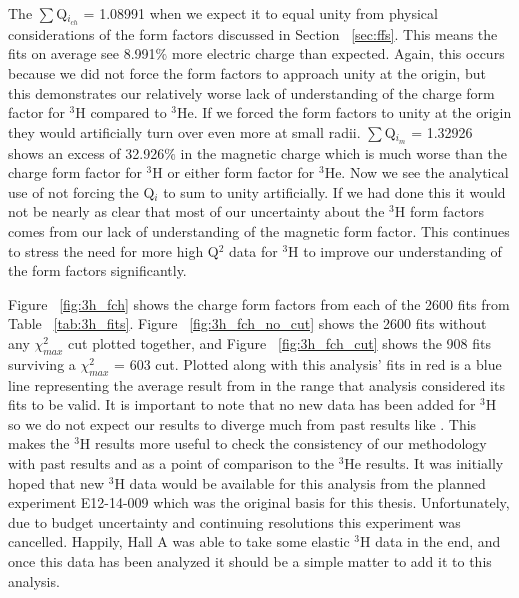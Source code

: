 The $\sum$Q$_{i_{ch}}$ = 1.08991 when we expect it to equal unity from physical considerations of the form factors discussed in Section ~\ref{sec:ffs}. This means the fits on average see 8.991$\%$ more electric charge than expected. Again, this occurs because we did not force the form factors to approach unity at the origin, but this demonstrates our relatively worse lack of understanding of the charge form factor for $^3$H compared to $^3$He. If we forced the form factors to unity at the origin they would artificially turn over even more at small radii. $\sum$Q$_{i_{m}}$ = 1.32926 shows an excess of 32.926$\%$ in the magnetic charge which is much worse than the charge form factor for $^3$H or either form factor for $^3$He. Now we see the analytical use of not forcing the Q$_i$ to sum to unity artificially. If we had done this it would not be nearly as clear that most of our uncertainty about the $^3$H form factors comes from our lack of understanding of the magnetic form factor. This continues to stress the need for more high Q$^2$ data for $^3$H to improve our understanding of the form factors significantly.

Figure ~\ref{fig:3h_fch} shows the charge form factors from each of the 2600 fits from Table ~\ref{tab:3h_fits}. Figure ~\ref{fig:3h_fch_no_cut} shows the 2600 fits without any $\chi^2_{max}$ cut plotted together, and Figure ~\ref{fig:3h_fch_cut} shows the 908 fits surviving a $\chi^2_{max}$ = 603 cut. Plotted along with this analysis' fits in red is a blue line representing the average result from \cite{Article:Amroun} in the range that analysis considered its fits to be valid. It is important to note that no new data has been added for $^3$H so we do not expect our results to diverge much from past results like \cite{Article:Amroun}. This makes the $^3$H results more useful to check the consistency of our methodology with past results and as a point of comparison to the $^3$He results. It was initially hoped that new $^3$H data would be available for this analysis from the planned experiment E12-14-009 \cite{3h_proposal} which was the original basis for this thesis. Unfortunately, due to budget uncertainty and continuing resolutions this experiment was cancelled. Happily, Hall A was able to take some elastic $^3$H data in the end, and once this data has been analyzed it should be a simple matter to add it to this analysis.

